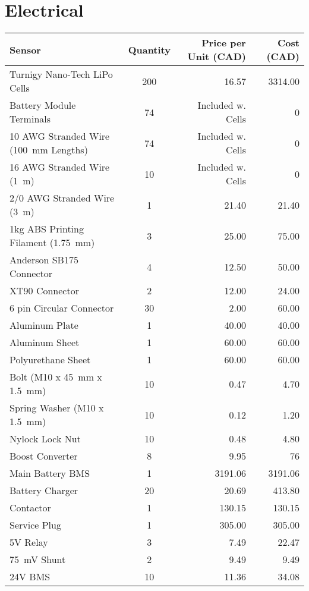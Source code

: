 \documentclass[main.tex]{subfiles}
\begin{document}
\section{Electrical}
\begin{table}[H]
  	  \centering
      \begin{tabular}{@{}lcrr@{}} \toprule
        Sensor & Quantity & Price per Unit (CAD) & Cost (CAD) \\ \midrule
        Turnigy Nano-Tech LiPo Cells& 200 & 16.57 & 3314.00 \\
        Battery Module Terminals& 74 & Included w. Cells & 0 \\
        10 AWG Stranded Wire (\SI{100}{mm} Lengths) & 74 & Included w. Cells & 0\\
        16 AWG Stranded Wire (\SI{1}{m}) & 10 & Included w. Cells & 0 \\
        2/0 AWG Stranded Wire (\SI{3}{m}) & 1 & 21.40 & 21.40 \\
        1kg ABS Printing Filament (\SI{1.75}{mm})& 3 & 25.00 & 75.00 \\
        Anderson SB175 Connector& 4 & 12.50 &50.00 \\
        XT90 Connector& 2 & 12.00 & 24.00 \\
        6 pin Circular Connector& 30 &  2.00 &  60.00\\
        Aluminum Plate& 1 & 40.00 & 40.00 \\
        Aluminum Sheet& 1 & 60.00 & 60.00 \\
        Polyurethane Sheet& 1 & 60.00 & 60.00 \\
        Bolt (M10 x \SI{45}{mm} x \SI{1.5}{mm})& 10 & 0.47 & 4.70 \\
        Spring Washer (M10 x \SI{1.5}{mm})& 10 & 0.12 & 1.20 \\
        Nylock Lock Nut& 10 & 0.48 & 4.80\\
        Boost Converter& 8 & 9.95 & 76 \\
        Main Battery BMS& 1 & 3191.06 & 3191.06 \\
        Battery Charger& 20 & 20.69 & 413.80 \\
        Contactor& 1 & 130.15 & 130.15 \\
        Service Plug& 1 & 305.00 & 305.00 \\
        5V Relay & 3 & 7.49 & 22.47 \\
        \SI{75}{mV} Shunt& 2 & 9.49 & 9.49 \\
        24V BMS& 10 & 11.36 & 34.08 \\

\end{tabular}
\end{table}
\end{document}
